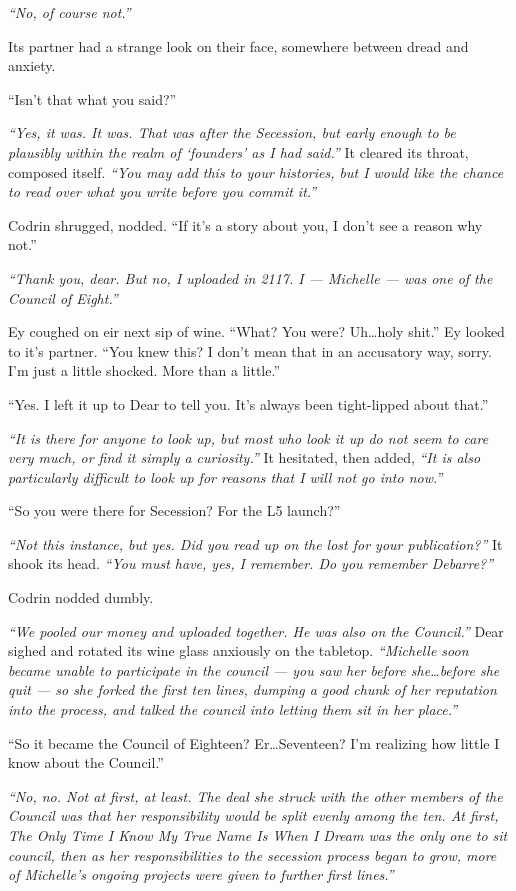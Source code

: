 \emph{``No, of course not.''}

Its partner had a strange look on their face, somewhere between dread and anxiety.

``Isn't that what you said?''

\emph{``Yes, it was. It was. That was after the Secession, but early enough to be plausibly within the realm of `founders' as I had said.''} It cleared its throat, composed itself. \emph{``You may add this to your histories, but I would like the chance to read over what you write before you commit it.''}

Codrin shrugged, nodded. ``If it's a story about you, I don't see a reason why not.''

\emph{``Thank you, dear. But no, I uploaded in 2117. I — Michelle — was one of the Council of Eight.''}

Ey coughed on eir next sip of wine. ``What? You were? Uh\ldots holy shit.'' Ey looked to it's partner. ``You knew this? I don't mean that in an accusatory way, sorry. I'm just a little shocked. More than a little.''

``Yes. I left it up to Dear to tell you. It's always been tight-lipped about that.''

\emph{``It is there for anyone to look up, but most who look it up do not seem to care very much, or find it simply a curiosity.''} It hesitated, then added, \emph{``It is also particularly difficult to look up for reasons that I will not go into now.''}

``So you were there for Secession? For the L5 launch?''

\emph{``Not this instance, but yes. Did you read up on the lost for your publication?''} It shook its head. \emph{``You must have, yes, I remember. Do you remember Debarre?''}

Codrin nodded dumbly.

\emph{``We pooled our money and uploaded together. He was also on the Council.''} Dear sighed and rotated its wine glass anxiously on the tabletop. \emph{``Michelle soon became unable to participate in the council — you saw her before she\ldots before she quit — so she forked the first ten lines, dumping a good chunk of her reputation into the process, and talked the council into letting them sit in her place.''}

``So it became the Council of Eighteen? Er\ldots Seventeen? I'm realizing how little I know about the Council.''

\emph{``No, no. Not at first, at least. The deal she struck with the other members of the Council was that her responsibility would be split evenly among the ten. At first, The Only Time I Know My True Name Is When I Dream was the only one to sit council, then as her responsibilities to the secession process began to grow, more of Michelle's ongoing projects were given to further first lines.''}

